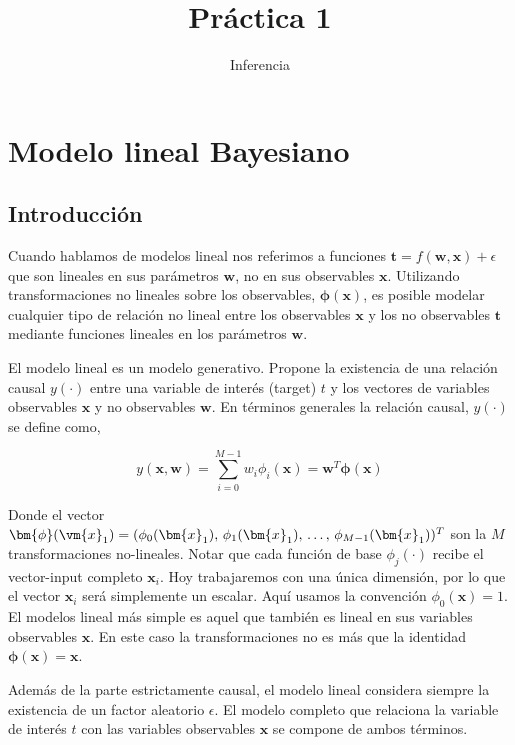 \documentclass[a4paper,10pt]{article}
\title{Práctica 1}
\author{Inferencia}
\begin{document}
\maketitle


\section{Modelo lineal Bayesiano} \label{sec:lineal}

\subsection{Introducci\'on}

Cuando hablamos de modelos lineal nos referimos a funciones $\bm{t}= f(\bm{w},\bm{x}) + \epsilon $ que son lineales en sus parámetros $\bm{w}$, no en sus observables $\bm{x}$.
Utilizando transformaciones no lineales sobre los observables, $\bm{\phi}(\bm{x})$, es posible modelar cualquier tipo de relaci\'on no lineal entre los observables $\bm{x}$ y los no observables $\bm{t}$ mediante funciones lineales en los par\'ametros $\bm{w}$.

\vspace{0.3cm}

El modelo lineal es un modelo generativo. Propone la existencia de una relaci\'on causal $y(\cdot)$ entre una variable de inter\'es (target) $t$ y los vectores de variables observables $\bm{x}$ y no observables $\bm{w}$.
En t\'erminos generales la relaci\'on causal, $y(\cdot)$ se define como,

\begin{equation}
y(\bm{x},\bm{w}) = \sum_{i=0}^{M-1} w_i \phi_i(\bm{x}) = \bm{w}^T \bm{\phi}(\bm{x})
\end{equation}
 
Donde el vector $\bm{\phi}(\vm{x}_1) = ( \phi_0(\bm{x}_1), \, \phi_1(\bm{x}_1) , \, \dots , \, \phi_{M-1}(\bm{x}_1) )^T$ son la $M$ transformaciones no-lineales.
Notar que cada funci\'on de base $\phi_j(\cdot)$ recibe el vector-input completo $\bm{x}_i$.
Hoy trabajaremos con una \'unica dimensi\'on, por lo que el vector $\bm{x}_i$ ser\'a simplemente un escalar.
Aqu\'i usamos la convenci\'on $\phi_0(\bm{x})=1$.
El modelos lineal m\'as simple es aquel que tambi\'en es lineal en sus variables observables $\bm{x}$.
En este caso la transformaciones no es m\'as que la identidad $\bm{\phi}(\bm{x})=\bm{x}$.

Adem\'as de la parte estrictamente causal, el modelo lineal considera siempre la existencia de un factor aleatorio $\epsilon$.
El modelo completo que relaciona la variable de inter\'es $t$ con las variables observables $\bm{x}$ se compone de ambos t\'erminos.
\end{document}
